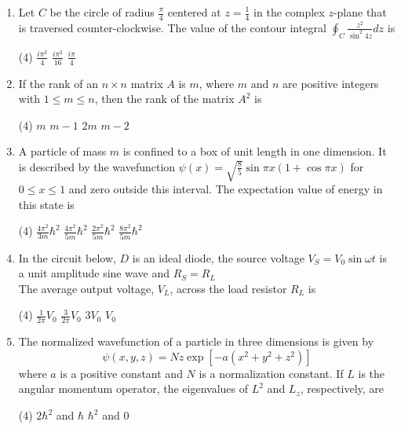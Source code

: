 \begin{enumerate}
\item Let $C$ be the circle of radius $\frac{\pi}{4}$ centered at $z=\frac{1}{4}$ in the complex $z$-plane that is traversed counter-clockwise. The value of the contour integral $\oint_{C} \frac{z^{2}}{\sin ^{2} 4 z} d z$ is
 \begin{tasks}(4)
	\task[\textbf{b.}]$\frac{i \pi^{2}}{4}$
	\task[\textbf{c.}] $\frac{i \pi^{2}}{16}$
	\task[\textbf{d.}] $\frac{i \pi}{4}$
\end{tasks}
\item If the rank of an $n \times n$ matrix $A$ is $m$, where $m$ and $n$ are positive integers with $1 \leq m \leq n$, then the rank of the matrix $A^{2}$ is
 \begin{tasks}(4)
	\task[\textbf{a.}]$m$
	\task[\textbf{b.}]$m-1$
	\task[\textbf{c.}]$2 m$
	\task[\textbf{d.}]$m-2$ 
\end{tasks}
\item A particle of mass $m$ is confined to a box of unit length in one dimension. It is described by the wavefunction $\psi(x)=\sqrt{\frac{8}{5}} \sin \pi x(1+\cos \pi x)$ for $0 \leq x \leq 1$ and zero outside this interval. The expectation value of energy in this state is
 \begin{tasks}(4)
	\task[\textbf{a.}] $\frac{4 \pi^{2}}{3 m} \hbar^{2}$
	\task[\textbf{b.}]$\frac{4 \pi^{2}}{5 m} \hbar^{2}$
	\task[\textbf{c.}]$\frac{2 \pi^{2}}{5 m} \hbar^{2}$
	\task[\textbf{d.}]  $\frac{8 \pi^{2}}{5 m} \hbar^{2}$
\end{tasks}
\item In the circuit below, $D$ is an ideal diode, the source voltage $V_{S}=V_{0} \sin \omega t$ is a unit amplitude sine wave and $R_{S}=R_{L}$	\\
The average output voltage, $V_{L}$, across the load resistor $R_{L}$ is
 \begin{tasks}(4)
	\task[\textbf{a.}] $\frac{1}{2 \pi} V_{0}$
	\task[\textbf{b.}] $\frac{3}{2 \pi} V_{0}$
	\task[\textbf{c.}]$3 V_{0}$
	\task[\textbf{d.}]$V_{0}$ 
\end{tasks}
\item The normalized wavefunction of a particle in three dimensions is given by
$$
\psi(x, y, z)=N z \exp \left[-a\left(x^{2}+y^{2}+z^{2}\right)\right]
$$
where $a$ is a positive constant and $N$ is a normalization constant. If $L$ is the angular momentum operator, the eigenvalues of $L^{2}$ and $L_{z}$, respectively, are
 \begin{tasks}(4)
	\task[\textbf{a.}]$2 \hbar^{2}$ and $\hbar$
	\task[\textbf{b.}]$\hbar^{2}$ and 0

\end{tasks}
\end{enumerate}
